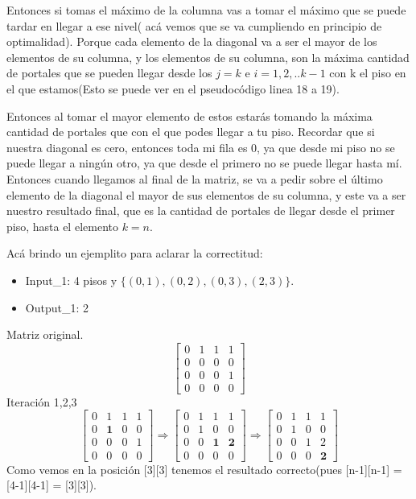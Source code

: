 Entonces si tomas el máximo de la columna vas a tomar el máximo que se puede tardar en llegar a ese nivel( acá vemos que se va cumpliendo en principio de optimalidad). Porque cada elemento de la diagonal va a ser el mayor de los elementos de su columna, y los elementos de su columna, son la máxima cantidad de portales que se pueden llegar desde los $j=k$ e  $i=1,2,..k-1$ con k el piso en el que estamos(Esto se puede ver en el pseudocódigo linea 18 a 19). \newline

Entonces al tomar el mayor elemento de estos estarás tomando la máxima cantidad de portales que con el que podes llegar a tu piso. Recordar que si nuestra diagonal es cero, entonces toda mi fila es 0, ya que desde mi piso no se puede llegar a ningún otro, ya que desde el primero no se puede llegar hasta mí. Entonces cuando llegamos al final de la matriz, se va a pedir sobre el último elemento de la diagonal el mayor de sus elementos de su columna, y este va a ser nuestro resultado final, que es la cantidad de portales de llegar desde el primer piso, hasta el elemento $k=n$. \newline 	


Acá brindo un ejemplito para aclarar la correctitud: \newline
\begin{itemize}
    \item Input_1: 4 pisos y $\{(0,1),(0,2),(0,3),(2,3)\}$.
    \item Output_1: 2 
\end{itemize}
Matriz original.
\begin{equation*}
	\begin{bmatrix}
	0 & 1 & 1 & 1 \\
	0 & 0 & 0 & 0 \\
	0 & 0 & 0 & 1 \\
	0 & 0 & 0 & 0
	\end{bmatrix}
\end{equation*}
Iteración 1,2,3	
\begin{equation*}	
	\begin{bmatrix}
	0 & 1 & 1 & 1 \\
	0 & \textbf{1} & 0 & 0 \\
	0 & 0 & 0 & 1 \\
	0 & 0 & 0 & 0
	\end{bmatrix}		
		\Rightarrow
	\begin{bmatrix}
	0 & 1 & 1 & 1 \\
	0 & 1 & 0 & 0 \\
	0 & 0 & \textbf{1} & \textbf{2} \\
	0 & 0 & 0 & 0
	\end{bmatrix}
		\Rightarrow
	\begin{bmatrix}
	0 & 1 & 1 & 1 \\
	0 & 1 & 0 & 0 \\
	0 & 0 & 1 & 2 \\
	0 & 0 & 0 & \textbf{2}
	\end{bmatrix}
\end{equation*}
Como vemos en la posición [3][3] tenemos el resultado correcto(pues [n-1][n-1] = [4-1][4-1] = [3][3]).


